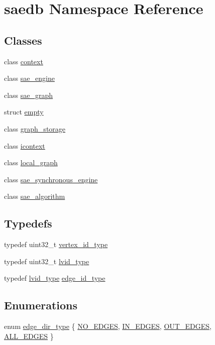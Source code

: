 \hypertarget{namespacesaedb}{\section{saedb Namespace Reference}
\label{d9/dc5/namespacesaedb}
}
\subsection*{Classes}
\begin{DoxyCompactItemize}
\item 
class \hyperlink{classsaedb_1_1context}{context}
\item 
class \hyperlink{classsaedb_1_1sae__engine}{sae\-\_\-engine}
\item 
class \hyperlink{classsaedb_1_1sae__graph}{sae\-\_\-graph}
\item 
struct \hyperlink{structsaedb_1_1empty}{empty}
\item 
class \hyperlink{classsaedb_1_1graph__storage}{graph\-\_\-storage}
\item 
class \hyperlink{classsaedb_1_1icontext}{icontext}
\item 
class \hyperlink{classsaedb_1_1local__graph}{local\-\_\-graph}
\item 
class \hyperlink{classsaedb_1_1sae__synchronous__engine}{sae\-\_\-synchronous\-\_\-engine}
\item 
class \hyperlink{classsaedb_1_1sae__algorithm}{sae\-\_\-algorithm}
\end{DoxyCompactItemize}
\subsection*{Typedefs}
\begin{DoxyCompactItemize}
\item 
typedef uint32\-\_\-t \hyperlink{namespacesaedb_a502e07e24003e811ae3bd73514c2798a}{vertex\-\_\-id\-\_\-type}
\item 
typedef uint32\-\_\-t \hyperlink{namespacesaedb_ae0f2df508bdfd29505d57534c8ed4a65}{lvid\-\_\-type}
\item 
typedef \hyperlink{namespacesaedb_ae0f2df508bdfd29505d57534c8ed4a65}{lvid\-\_\-type} \hyperlink{namespacesaedb_af76c9a21f199f95828dd18699754cad1}{edge\-\_\-id\-\_\-type}
\end{DoxyCompactItemize}
\subsection*{Enumerations}
\begin{DoxyCompactItemize}
\item 
enum \hyperlink{namespacesaedb_adf5ad13c09a48fb2f42f8e7348ea3ac3}{edge\-\_\-dir\-\_\-type} \{ \hyperlink{namespacesaedb_adf5ad13c09a48fb2f42f8e7348ea3ac3a9fff15c8a891e45b0e19a4f164b7f93f}{N\-O\-\_\-\-E\-D\-G\-E\-S}, 
\hyperlink{namespacesaedb_adf5ad13c09a48fb2f42f8e7348ea3ac3a71ec98c5ef3686233cdcd0234fbdffe5}{I\-N\-\_\-\-E\-D\-G\-E\-S}, 
\hyperlink{namespacesaedb_adf5ad13c09a48fb2f42f8e7348ea3ac3a7e77290ddb5b73f4ed2d39a9627c2786}{O\-U\-T\-\_\-\-E\-D\-G\-E\-S}, 
\hyperlink{namespacesaedb_adf5ad13c09a48fb2f42f8e7348ea3ac3a49d613a86fc84d8a45d95ecd1354912e}{A\-L\-L\-\_\-\-E\-D\-G\-E\-S}
 \}
\end{DoxyCompactItemize}

